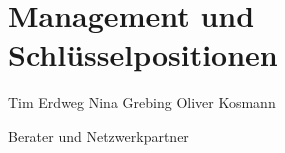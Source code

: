 \chapter{Management und Schlüsselpositionen}
\label{cha:7}
Tim Erdweg
Nina Grebing
Oliver Kosmann

Berater und Netzwerkpartner
 